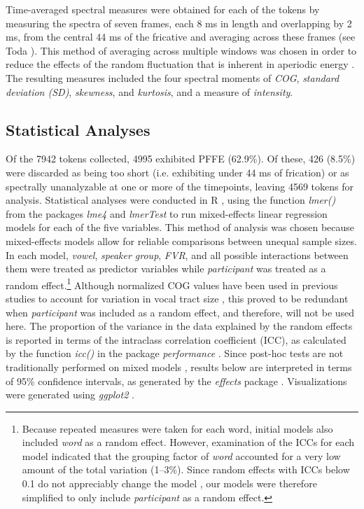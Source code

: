 \documentclass[output=paper,colorlinks,citecolor=brown,draftmode]{langscibook}
\begin{document}
Time-averaged spectral measures were obtained for each of the tokens by measuring the spectra of seven frames, each 8 ms in length and overlapping by 2 ms, from the central 44 ms of the fricative and averaging across these frames (see Toda \citeyear{toda2007speaker,toda2009etude}). This method of averaging across multiple windows was chosen in order to reduce the effects of the random fluctuation that is inherent in aperiodic energy \citep{toda2010formant}. The resulting measures included the four spectral moments of \emph{COG}, \emph{standard deviation (SD)}, \emph{skewness}, and \emph{kurtosis}, and a measure of \emph{intensity}.

\subsection{Statistical Analyses}
Of the 7942 tokens collected, 4995 exhibited PFFE (62.9\%). Of these, 426 (8.5\%) were discarded as being too short (i.e. exhibiting under 44 ms of frication) or as spectrally unanalyzable at one or more of the timepoints, leaving 4569 tokens for analysis.
Statistical analyses were conducted in R \citep{r}, using the function \emph{lmer()} from the packages \emph{lme4} \citep{bates2014fitting} and \emph{lmerTest} \citep{kuznetsova2017lmertest} to run mixed-effects linear regression models for each of the five variables. This method of analysis was chosen because mixed-effects models allow for reliable comparisons between unequal sample sizes. In each model, \emph{vowel}, \emph{speaker group}, \emph{FVR}, and all possible interactions between them were treated as predictor variables while \emph{participant} was treated as a random effect.\footnote{Because repeated measures were taken for each word, initial models also included \emph{word} as a random effect. However, examination of the ICCs for each model indicated that the grouping factor of \emph{word} accounted for a very low amount of the total variation (1--3\%). Since random effects with ICCs below 0.1 do not appreciably change the model \citep{vajargah5nikbakht}, our models were therefore simplified to only include \emph{participant} as a random effect.} Although normalized COG values have been used in previous studies to account for variation in vocal tract size \citep{dalola2019shape,dalola2020redefining}, this proved to be redundant when \emph{participant} was included as a random effect, and therefore, will not be used here. The proportion of the variance in the data explained by the random effects is reported in terms of the intraclass correlation coefficient (ICC), as calculated by the function \emph{icc()} in the package \emph{performance} \citep{ludecke2021performance}.
Since post-hoc tests are not traditionally performed on mixed models \citep{levshina2015linguistics}, results below are interpreted in terms of 95\% confidence intervals, as generated by the \emph{effects} package \citep{fox2003effect,fox2018visualizing,fox2019r}. Visualizations were generated using \emph{ggplot2} \citep{wickham2016ggplot2}.
\end{document}
